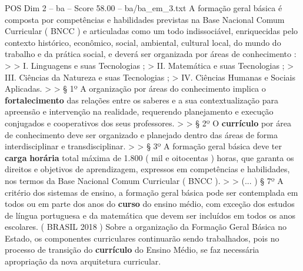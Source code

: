 \begin{textsample}{POS Dim 2 – ba – Score 58.00 – ba/ba\_em\_3.txt}
A formação geral básica é composta por competências e habilidades previstas na Base Nacional Comum Curricular ( BNCC ) e articuladas como um todo indissociável, enriquecidas pelo contexto histórico, econômico, social, ambiental, cultural local, do mundo do trabalho e da prática social, e deverá ser organizada por áreas de conhecimento : > > I.
Linguagens e suas Tecnologias ; > II.
Matemática e suas Tecnologias ; > III.
Ciências da Natureza e suas Tecnologias ; > IV.
Ciências Humanas e Sociais Aplicadas. > > § 1º A organização por áreas do conhecimento implica o \textbf{fortalecimento} das relações entre os saberes e a sua contextualização para apreensão e intervenção na realidade, requerendo planejamento e execução conjugados e cooperativos dos seus professores. > > § 2º O \textbf{currículo} por área de conhecimento deve ser organizado e planejado dentro das áreas de forma interdisciplinar e transdisciplinar. > > § 3º A formação geral básica deve ter \textbf{carga} \textbf{horária} total máxima de 1.800 ( mil e oitocentas ) horas, que garanta os direitos e objetivos de aprendizagem, expressos em competências e habilidades, nos termos da Base Nacional Comum Curricular ( BNCC ). > > (... ) § 7º A critério dos sistemas de ensino, a formação geral básica pode ser contemplada em todos ou em parte dos anos do \textbf{curso} do ensino médio, com exceção dos estudos de língua portuguesa e da matemática que devem ser incluídos em todos os anos escolares. ( BRASIL 2018 ) Sobre a organização da Formação Geral Básica no Estado, os componentes curriculares continuarão sendo trabalhados, pois no processo de transição do \textbf{currículo} do Ensino Médio, se faz necessária apropriação da nova arquitetura curricular.

\end{textsample}

